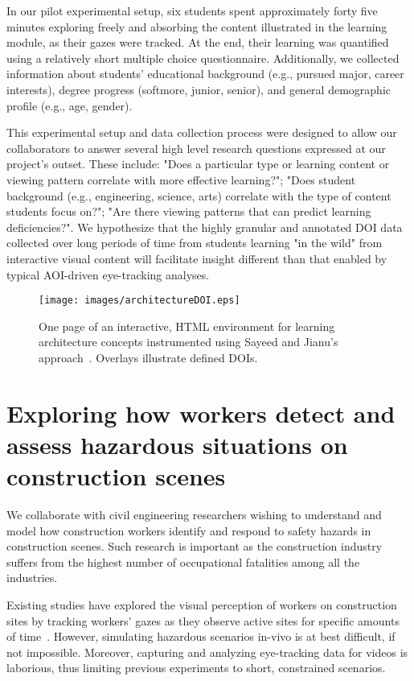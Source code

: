 In our pilot experimental setup, six students spent approximately forty five minutes exploring freely and absorbing the content illustrated in the learning module, as their gazes were tracked. At the end, their learning was quantified using a relatively short multiple choice questionnaire. Additionally, we collected information about students' educational background (e.g., pursued major, career interests), degree progress (softmore, junior, senior), and general demographic profile (e.g., age, gender).

This experimental setup and data collection process were designed to allow our collaborators to answer several high level research questions expressed at our project's outset. These include: "Does a particular type or learning content or viewing pattern correlate with more effective learning?"; "Does student background (e.g., engineering, science, arts) correlate with the type of content students focus on?"; "Are there viewing patterns that can predict learning deficiencies?". We hypothesize that the highly granular and annotated DOI data collected over long periods of time from students learning "in the wild" from interactive visual content will facilitate insight different than that enabled by typical AOI-driven eye-tracking analyses.

\begin{figure}[htbp]
  \centering
  \texttt{[image: images/architectureDOI.eps]}
  \caption{One page of an interactive, HTML environment for learning architecture concepts instrumented using Sayeed and Jianu's approach~\cite{Ala16}. Overlays illustrate defined DOIs.}
	\label{fig:archictecture}
\end{figure}

\section{Exploring how workers detect and assess hazardous situations on construction scenes}
\label{sec:ExperimentConstruction}
We collaborate with civil engineering researchers wishing to understand and model how construction workers identify and respond to safety hazards in construction scenes. Such research is important as the construction  industry  suffers  from the  highest  number  of  occupational  fatalities  among  all  the  industries. 

Existing studies have explored the visual perception of workers on construction sites by tracking workers' gazes as they observe active sites for specific amounts of time~\cite{SafetyPerf}. However, simulating hazardous scenarios in-vivo is at best difficult, if not impossible. 
Moreover, capturing and analyzing eye-tracking data for videos is laborious, thus limiting previous experiments to short, constrained scenarios. 

